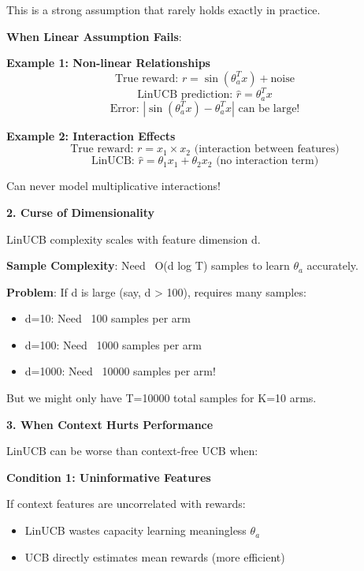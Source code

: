 \documentclass[12pt]{article}
\begin{document}
{{{This is a strong assumption that rarely holds exactly in practice.

\textbf{When Linear Assumption Fails}:

\textbf{Example 1: Non-linear Relationships}
\begin{equation}
\text{True reward: } r = \sin(\theta_a^T x) + \text{noise}
\end{equation}
\begin{equation}
\text{LinUCB prediction: } \hat{r} = \theta_a^T x
\end{equation}
\begin{equation}
\text{Error: } |\sin(\theta_a^T x) - \theta_a^T x| \text{ can be large!}
\end{equation}

\textbf{Example 2: Interaction Effects}
\begin{equation}
\text{True reward: } r = x_1 \times x_2 \text{ (interaction between features)}
\end{equation}
\begin{equation}
\text{LinUCB: } \hat{r} = \theta_1 x_1 + \theta_2 x_2 \text{ (no interaction term)}
\end{equation}

Can never model multiplicative interactions!

\textbf{2. Curse of Dimensionality}

LinUCB complexity scales with feature dimension d.

\textbf{Sample Complexity}: Need ~O(d log T) samples to learn $\theta_a$ accurately.

\textbf{Problem}: If d is large (say, d > 100), requires many samples:
\begin{itemize}
\item d=10: Need ~100 samples per arm
\item d=100: Need ~1000 samples per arm
\item d=1000: Need ~10000 samples per arm!
\end{itemize}

But we might only have T=10000 total samples for K=10 arms.

\textbf{3. When Context Hurts Performance}

LinUCB can be worse than context-free UCB when:

\textbf{Condition 1: Uninformative Features}

If context features are uncorrelated with rewards:
\begin{itemize}
\item LinUCB wastes capacity learning meaningless $\theta_a$
\item UCB directly estimates mean rewards (more efficient)
\end{itemize}

}}}
\end{document}
